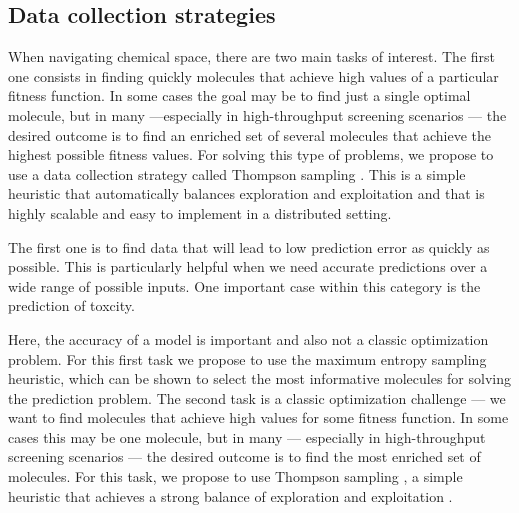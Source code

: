 \subsection{Data collection strategies}

When navigating chemical space, there are two main tasks of interest. The first one consists in finding quickly molecules that achieve high values of a particular fitness function. In some cases the goal may be to find just a single optimal molecule, but in many ---especially in high-throughput screening scenarios \cite{pyzer-knapp_what_2015}--- the desired outcome is to find 
an enriched set of several molecules that achieve the highest possible fitness values. For solving this type of problems, we propose to use a data collection strategy called Thompson sampling \cite{thompson_likelihood_1933}. This is a simple heuristic that automatically balances exploration and exploitation \cite{Chapelle2011} and that is highly scalable and easy to implement in a distributed setting.

The first one is to find data that will lead to low prediction error as quickly as possible. This is particularly helpful when we need accurate predictions over a wide range of possible inputs. One important case within this category is the prediction of toxcity. 

Here, the accuracy of a model is important and  also not a classic optimization problem. For this first task we propose to use the maximum entropy sampling heuristic, which can be shown to select the most informative molecules for solving
the prediction problem.  The second task is a classic optimization challenge --- we want to find molecules that achieve high values for some fitness
function.  In some cases this may be one molecule, but in many --- especially in high-throughput screening scenarios \cite{pyzer-knapp_what_2015} --- the
desired outcome is to find the most enriched set of molecules. For this task, we propose to use Thompson sampling \cite{thompson_likelihood_1933}, a simple
heuristic that achieves a strong balance of exploration and exploitation \cite{Chapelle2011}.